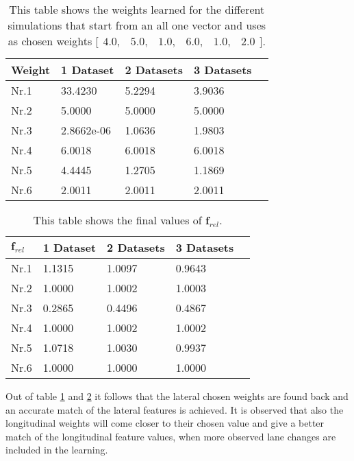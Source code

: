 \begin{table}[h!]
	\centering
	\begin{tabular}{@{}llllr@{}} \toprule
		\textbf{Weight}   & 1 Dataset    & 2 Datasets     & 3 Datasets\\ \midrule
		Nr.1       		  &33.4230       & 5.2294       & 3.9036		\\
		Nr.2              & 5.0000         & 5.0000          & 5.0000       \\
		Nr.3              & 2.8662e-06     & 1.0636      & 1.9803      \\
		Nr.4              & 6.0018           & 6.0018            &   6.0018     \\
		Nr.5              & 4.4445     & 1.2705      & 1.1869       \\
		Nr.6              & 2.0011        & 2.0011         & 2.0011      \\ \bottomrule
	\end{tabular}
	\caption{This table shows the weights learned for the different simulations that start from an all one vector and uses as chosen weights $\bigl[ \begin{smallmatrix} 4.0,&5.0,&1.0,&6.0,&1.0,&2.0\end{smallmatrix}\bigr]$.}
	\label{tab:complex_learning_weights}
\end{table}

\begin{table}[h!]
	\centering
	\begin{tabular}{@{}llllr@{}} \toprule
		$\bm{f}_{rel}$   & 1 Dataset    & 2 Datasets     & 3 Datasets\\ \midrule
		Nr.1       		  &1.1315        & 1.0097       & 0.9643		\\
		Nr.2              & 1.0000         & 1.0002     & 1.0003       \\
		Nr.3              & 0.2865     & 0.4496     	& 0.4867      \\
		Nr.4              & 1.0000           & 1.0002   &   1.0002     \\
		Nr.5              & 1.0718     & 1.0030         & 0.9937       \\
		Nr.6              & 1.0000        & 1.0000      & 1.0000     \\ \bottomrule
	\end{tabular}
	\caption{This table shows the final values of $\bm{f}_{rel}$.}
	\label{tab:complex_frel}
\end{table}

Out of table \ref{tab:complex_learning_weights} and \ref{tab:complex_frel} it follows that the lateral chosen weights are found back and an accurate match of the lateral features is achieved. It is observed that also the longitudinal weights will come closer to their chosen value and give a better match of the longitudinal feature values, when more observed lane changes are included in the learning.\\

